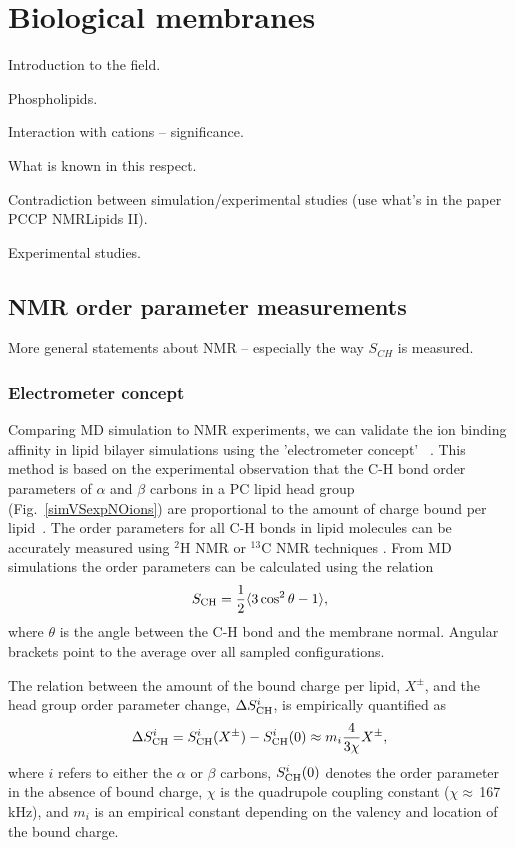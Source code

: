 \chapter{Biological membranes}

 Introduction to the field. 
 \citep{Student08}

 Phospholipids. 

 Interaction with cations -- significance. 

 What is known in this respect. 

 Contradiction between simulation/experimental studies 
(use what's in the paper PCCP NMRLipids II). 

Experimental studies. 

\section{NMR order parameter measurements}
 
  More general statements about NMR  -- especially the way $S_{CH}$ is measured. 

\subsection{Electrometer concept} \label{section:electrometer} 

Comparing MD simulation to NMR experiments, we can validate the ion 
binding affinity in lipid bilayer simulations using the 'electrometer concept'~ \citep{seelig87, catte16}. 
This method is based on the experimental observation that the C-H bond order parameters of $\alpha$ and $\beta$ carbons in a PC lipid head group (Fig.~\ref{simVSexpNOions}) are proportional to the amount of charge bound per lipid~\citep{seelig87}. 
The order parameters for all C-H bonds in lipid molecules can be accurately measured using $^2$H NMR or $^{13}$C NMR techniques \citep{ollila16}. 
From MD simulations the order parameters can be calculated using the relation 
\begin{equation}\label{OP} 
S_{\rm CH}=\frac{1}{2}\langle 3\cos^2\theta -1 \rangle, 
\end{equation} 
where $\theta$ is the angle between the C-H bond and the membrane normal. 
Angular brackets point to the average over all sampled configurations. 
 
The relation between the amount of the bound charge per lipid, $X^\pm$, and the head group order parameter change, $\Delta S_{\rm{CH}}^{i}$, is empirically quantified as~\citep{seelig87,ferreira16} 
\begin{equation}\label{OPchangeEQ} 
\Delta S_{\rm{CH}}^{i}= S_{\rm{CH}}^{i}(X^\pm)-S_{\rm{CH}}^{i}(0) \approx m_i \frac{4 }{3\chi}X^\pm, 
\end{equation} 
where $i$ refers to either the $\alpha$ or $\beta$ carbons, $S_{\rm{CH}}^{i}(0)$ denotes the order parameter in the absence of bound charge, $\chi$ is the quadrupole coupling constant ($\chi \approx$\,167\,kHz), and $m_i$ is an empirical constant depending on the valency and location of the bound charge. 
 
